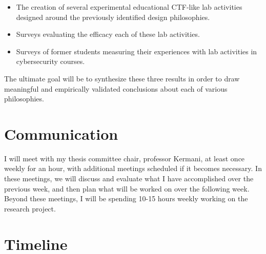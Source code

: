 \documentclass{article}
\begin{document}
    \begin{itemize}
        \item The creation of several experimental educational CTF-like lab activities designed around the previously identified design philosophies. 
        \item Surveys evaluating the efficacy each of these lab activities.\
        \item Surveys of former students measuring their experiences with lab activities in cybersecurity courses. 
    \end{itemize}

    The ultimate goal will be to synthesize these three results in order to draw meaningful and empirically validated conclusions about each of various philosophies.
    
    
\section{Communication}

    I will meet with my thesis committee chair, professor Kermani, at least once weekly for an hour, with additional meetings scheduled if it becomes necessary. %
In these meetings, we will discuss and evaluate what I have accomplished over the previous week, and then plan what will be worked on over the following week. %
Beyond these meetings, I will be spending 10-15 hours weekly working on the research project. %
     
\section{Timeline}

    
\end{document}
